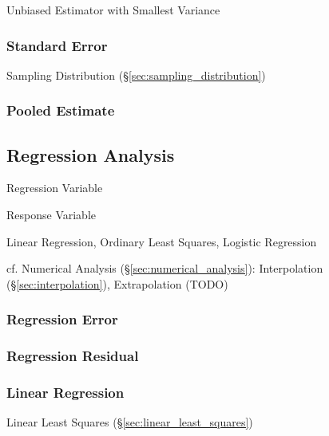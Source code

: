 Unbiased Estimator with Smallest Variance



\subsubsection{Standard Error}\label{sec:standard_error}

Sampling Distribution (\S\ref{sec:sampling_distribution})



\subsubsection{Pooled Estimate}\label{sec:pooled_estimate}




\subsection{Regression Analysis}\label{sec:regression_analysis}

Regression Variable

Response Variable


Linear Regression, Ordinary Least Squares, Logistic Regression

cf. Numerical Analysis (\S\ref{sec:numerical_analysis}): Interpolation
(\S\ref{sec:interpolation}), Extrapolation (TODO)



\subsubsection{Regression Error}\label{sec:regression_error}

\subsubsection{Regression Residual}\label{sec:regression_residual}

\subsubsection{Linear Regression}\label{sec:linear_regression}

Linear Least Squares (\S\ref{sec:linear_least_squares})

